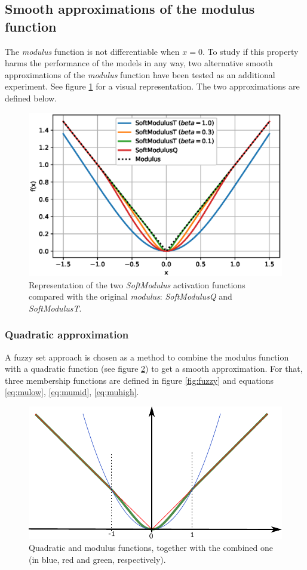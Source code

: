 \subsection{Smooth approximations of the modulus function}
The \textit{modulus} function is not differentiable when $x=0$. To study if this property harms the performance of the models in any way, two alternative smooth approximations of the \textit{modulus} function have been tested as an additional experiment. See figure \ref{fig:activationssmooth} for a visual representation. The two approximations are defined below.


\begin{figure}[h!]
	\centering
	\includegraphics[width=0.5\linewidth]{modulus/images/activations_smooth}
	\caption[Soft approximations to the \textit{modulus}]{Representation of the two \textit{SoftModulus} activation functions compared with the original \textit{modulus}: \textit{SoftModulusQ} and \textit{SoftModulusT}.}
	\label{fig:activationssmooth}
\end{figure}


\subsubsection{Quadratic approximation}
A fuzzy set approach is chosen as a method to combine the modulus function with a quadratic function (see figure \ref{fig:fuzzy_funcs}) to get a smooth approximation. For that, three membership functions are defined in figure \ref{fig:fuzzy} and equations \ref{eq:mulow}, \ref{eq:mumid}, \ref{eq:muhigh}.

\begin{figure}[h!]
	\centering
	\includegraphics[width=0.7\linewidth]{modulus/images/funcs_quad}
	\caption[Functions used for the quadratic approximation of the \textit{modulus}]{Quadratic and modulus functions, together with the combined one (in blue, red and green, respectively).}
	\label{fig:fuzzy_funcs}
\end{figure}

